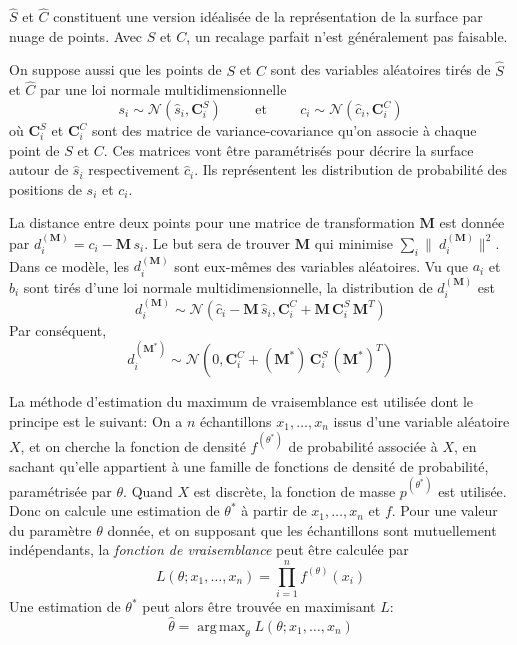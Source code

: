 \documentclass[a4paper,10pt]{scrreprt}
\DeclareMathOperator*{\argmax}{arg\,max}
\begin{document}
$\hat{S}$ et $\hat{C}$ constituent une version idéalisée de la représentation de la surface par nuage de points. Avec $S$ et $C$, un recalage parfait n'est généralement pas faisable.

On suppose aussi que les points de $S$ et $C$ sont des variables aléatoires tirés de $\hat{S}$ et $\hat{C}$ par une loi normale multidimensionnelle
\begin{equation}
	s_i \sim \mathcal{N}(\hat{s}_i, \mathbf{C}^S_i)
	\hspace{1cm} \text{et} \hspace{1cm}
	c_i \sim \mathcal{N}(\hat{c}_i, \mathbf{C}^C_i)
\end{equation}
où $\mathbf{C}^S_i$ et $\mathbf{C}^C_i$ sont des matrice de variance-covariance qu'on associe à chaque point de $S$ et $C$. Ces matrices vont être paramétrisés pour décrire la surface autour de $\hat{s}_i$ respectivement $\hat{c}_i$. Ils représentent les distribution de probabilité des positions de $s_i$ et $c_i$.

La distance entre deux points pour une matrice de transformation $\mathbf{M}$ est donnée par $d^{(\mathbf{M})}_i = c_i - \mathbf{M} \, s_i$. Le but sera de trouver $\mathbf{M}$ qui minimise $\sum_{i} \|\ d^{(\mathbf{M})}_i \|^2$. Dans ce modèle, les $d^{(\mathbf{M})}_i$ sont eux-mêmes des variables aléatoires. Vu que $a_i$ et $b_i$ sont tirés d'une loi normale multidimensionnelle, la distribution de $d^{(\mathbf{M})}_i$ est
\begin{equation} \label{eq:dist_distr}
	d^{(\mathbf{M})}_i \sim \mathcal{N}(\hat{c}_i - \mathbf{M}\,\hat{s}_i, \mathbf{C}^C_i + \mathbf{M}\,\mathbf{C}^S_i\,\mathbf{M}^T)
\end{equation}
Par conséquent,
\begin{equation}
	d^{(\mathbf{M}^*)}_i \sim \mathcal{N}(0, \mathbf{C}^C_i + (\mathbf{M}^*)\,\mathbf{C}^S_i\,(\mathbf{M}^*)^T)
\end{equation}

La méthode d'estimation du maximum de vraisemblance est utilisée dont le principe est le suivant: On a $n$ échantillons $x_1, \ldots, x_n$ issus d'une variable aléatoire $X$, et on cherche la fonction de densité $f^{(\theta^*)}$ de probabilité associée à $X$, en sachant qu'elle appartient à une famille de fonctions de densité de probabilité, paramétrisée par $\theta$. Quand $X$ est discrète, la fonction de masse $p^{(\theta^*)}$ est utilisée. Donc on calcule une estimation de $\theta^*$ à partir de $x_1, \ldots, x_n$ et $f$. Pour une valeur du paramètre $\theta$ donnée, et on supposant que les échantillons sont mutuellement indépendants, la \emph{fonction de vraisemblance} peut être calculée par
\begin{equation}
	L(\theta; x_1, \ldots, x_n) = \prod_{i=1}^{n} f^{(\theta)}(x_i)
\end{equation}
Une estimation de $\theta^*$ peut alors être trouvée en maximisant $L$:
\begin{equation}
	\hat{\theta} = \argmax_{\theta} L(\theta; x_1, \ldots, x_n)
\end{equation}
\end{document}
